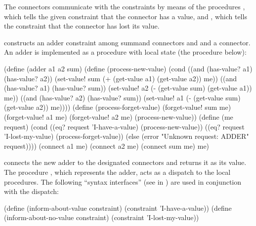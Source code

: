 \noindent
The connectors communicate with the constraints by means of the procedures
, which tells the given constraint that the connector
has a value, and , which tells the constraint that
the connector has lost its value.

 constructs an adder constraint among summand connectors 
and  and a  connector.  An adder is implemented as a
procedure with local state (the procedure  below):

\begin{codeBlock}
(define (adder a1 a2 sum)
  (define (process-new-value)
    (cond ((and (has-value? a1)
                (has-value? a2))
           (set-value! sum
                       (+ (get-value a1)
                          (get-value a2))
                       me))
          ((and (has-value? a1)
                (has-value? sum))
           (set-value! a2
                       (- (get-value sum)
                          (get-value a1))
                       me))
          ((and (has-value? a2)
                (has-value? sum))
           (set-value! a1
                       (- (get-value sum)
                          (get-value a2))
                       me))))
  (define (process-forget-value)
    (forget-value! sum me)
    (forget-value! a1 me)
    (forget-value! a2 me)
    (process-new-value))
  (define (me request)
    (cond ((eq? request 'I-have-a-value)
           (process-new-value))
          ((eq? request 'I-lost-my-value)
           (process-forget-value))
          (else
            (error "Unknown request: ADDER"
                   request))))
  (connect a1 me)
  (connect a2 me)
  (connect sum me)
  me)
\end{codeBlock}

\noindent
{} connects the new adder to the designated connectors and returns it
as its value.  The procedure , which represents the adder, acts as a
dispatch to the local procedures.  The following ``syntax interfaces'' (see
 in ) are used in conjunction with
the dispatch:

\begin{codeBlock}
(define (inform-about-value constraint)
  (constraint 'I-have-a-value))
(define (inform-about-no-value constraint)
  (constraint 'I-lost-my-value))
\end{codeBlock}

